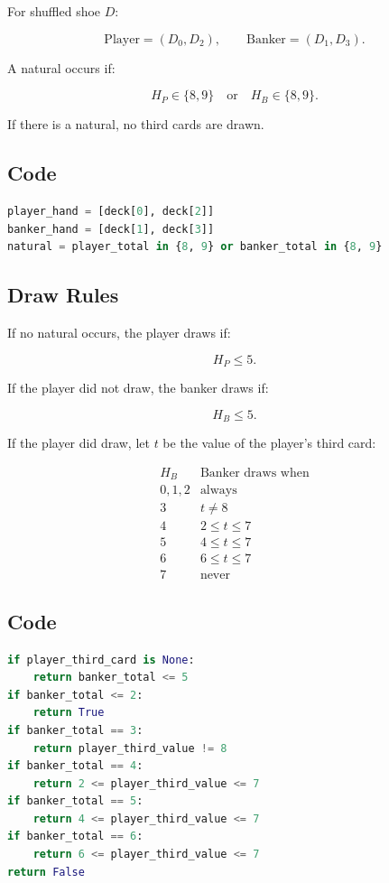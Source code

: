 \documentclass[11pt]{article}
\begin{document}
For shuffled shoe \(D\):

\[
\text{Player}=(D_0,D_2),\qquad \text{Banker}=(D_1,D_3).
\]

A natural occurs if:

\[
H_P\in\{8,9\}\quad\text{or}\quad H_B\in\{8,9\}.
\]

If there is a natural, no third cards are drawn.

\subsection{Code}

\begin{lstlisting}[language=Python]
player_hand = [deck[0], deck[2]]
banker_hand = [deck[1], deck[3]]
natural = player_total in {8, 9} or banker_total in {8, 9}
\end{lstlisting}

\subsection{Draw Rules}

If no natural occurs, the player draws if:

\[
H_P\leq 5.
\]

If the player did not draw, the banker draws if:

\[
H_B\leq 5.
\]

If the player did draw, let \(t\) be the value of the player's third card:

\[
\begin{array}{c|c}
H_B & \text{Banker draws when} \\
\hline
0,1,2 & \text{always} \\
3 & t\neq 8 \\
4 & 2\leq t\leq 7 \\
5 & 4\leq t\leq 7 \\
6 & 6\leq t\leq 7 \\
7 & \text{never}
\end{array}
\]

\subsection{Code}

\begin{lstlisting}[language=Python]
if player_third_card is None:
    return banker_total <= 5
if banker_total <= 2:
    return True
if banker_total == 3:
    return player_third_value != 8
if banker_total == 4:
    return 2 <= player_third_value <= 7
if banker_total == 5:
    return 4 <= player_third_value <= 7
if banker_total == 6:
    return 6 <= player_third_value <= 7
return False
\end{lstlisting}
\end{document}

